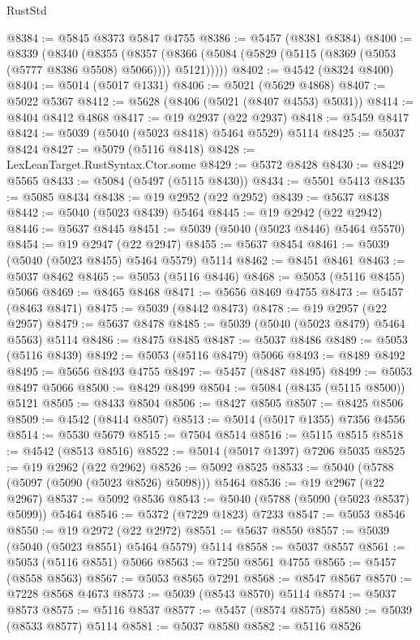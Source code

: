 \begin{lexlean}{RustStd}
\begin{coremodule}
@8384 := @5845 @8373 @5847 @4755
@8386 := @5457 (@8381 @8384)
@8400 := @8339
    (@8340
      (@8355
        (@8357 (@8366 (@5084 (@5829 (@5115 (@8369 (@5053 (@5777 @8386 @5508) @5066)))) @5121)))))
@8402 := @4542 (@8324 @8400)
@8404 := @5014 (@5017 @1331)
@8406 := @5021 (@5629 @4868)
@8407 := @5022 @5367
@8412 := @5628 (@8406 (@5021 (@8407 @4553) @5031))
@8414 := @8404 @8412 @4868
@8417 := @19 @2937 (@22 @2937)
@8418 := @5459 @8417
@8424 := @5039 (@5040 (@5023 @8418) @5464 @5529) @5114
@8425 := @5037 @8424
@8427 := @5079 (@5116 @8418)
@8428 := LexLeanTarget.RustSyntax.Ctor.some
@8429 := @5372 @8428
@8430 := @8429 @5565
@8433 := @5084 (@5497 (@5115 @8430))
@8434 := @5501 @5413
@8435 := @5085 @8434
@8438 := @19 @2952 (@22 @2952)
@8439 := @5637 @8438
@8442 := @5040 (@5023 @8439) @5464
@8445 := @19 @2942 (@22 @2942)
@8446 := @5637 @8445
@8451 := @5039 (@5040 (@5023 @8446) @5464 @5570)
@8454 := @19 @2947 (@22 @2947)
@8455 := @5637 @8454
@8461 := @5039 (@5040 (@5023 @8455) @5464 @5579) @5114
@8462 := @8451 @8461
@8463 := @5037 @8462
@8465 := @5053 (@5116 @8446)
@8468 := @5053 (@5116 @8455) @5066
@8469 := @8465 @8468
@8471 := @5656 @8469 @4755
@8473 := @5457 (@8463 @8471)
@8475 := @5039 (@8442 @8473)
@8478 := @19 @2957 (@22 @2957)
@8479 := @5637 @8478
@8485 := @5039 (@5040 (@5023 @8479) @5464 @5563) @5114
@8486 := @8475 @8485
@8487 := @5037 @8486
@8489 := @5053 (@5116 @8439)
@8492 := @5053 (@5116 @8479) @5066
@8493 := @8489 @8492
@8495 := @5656 @8493 @4755
@8497 := @5457 (@8487 @8495)
@8499 := @5053 @8497 @5066
@8500 := @8429 @8499
@8504 := @5084 (@8435 (@5115 @8500)) @5121
@8505 := @8433 @8504
@8506 := @8427 @8505
@8507 := @8425 @8506
@8509 := @4542 (@8414 @8507)
@8513 := @5014 (@5017 @1355) @7356 @4556
@8514 := @5530 @5679
@8515 := @7504 @8514
@8516 := @5115 @8515
@8518 := @4542 (@8513 @8516)
@8522 := @5014 (@5017 @1397) @7206 @5035
@8525 := @19 @2962 (@22 @2962)
@8526 := @5092 @8525
@8533 := @5040 (@5788 (@5097 (@5090 (@5023 @8526) @5098))) @5464
@8536 := @19 @2967 (@22 @2967)
@8537 := @5092 @8536
@8543 := @5040 (@5788 (@5090 (@5023 @8537) @5099)) @5464
@8546 := @5372 (@7229 @1823) @7233
@8547 := @5053 @8546
@8550 := @19 @2972 (@22 @2972)
@8551 := @5637 @8550
@8557 := @5039 (@5040 (@5023 @8551) @5464 @5579) @5114
@8558 := @5037 @8557
@8561 := @5053 (@5116 @8551) @5066
@8563 := @7250 @8561 @4755
@8565 := @5457 (@8558 @8563)
@8567 := @5053 @8565 @7291
@8568 := @8547 @8567
@8570 := @7228 @8568 @4673
@8573 := @5039 (@8543 @8570) @5114
@8574 := @5037 @8573
@8575 := @5116 @8537
@8577 := @5457 (@8574 @8575)
@8580 := @5039 (@8533 @8577) @5114
@8581 := @5037 @8580
@8582 := @5116 @8526

\end{coremodule}
\end{lexlean}
